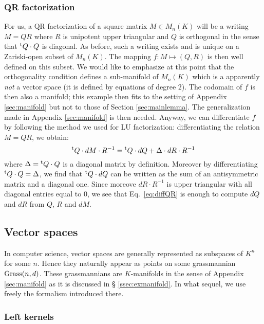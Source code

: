 \documentclass{lms}
\begin{document}
\subsubsection*{QR factorization}

For us, a QR factorization of a square matrix $M \in M_n(K)$ will be
a writing $M = QR$ where $R$ is unipotent upper triangular and $Q$ is
orthogonal in the sense that ${}^{\text t} Q \cdot Q$ is diagonal. As before, such 
a writing exists and is unique on a Zariski-open subset of $M_n(K)$. The
mapping $f : M \mapsto (Q,R)$ is then well defined on this subset. We 
would like to emphasize at this point that the orthogonality condition
defines a sub-manifold of $M_n(K)$ which is a apparently \emph{not} a
vector space (it is defined by equations of degree $2$). The codomain
of $f$ is then also a manifold; this example then fits to the setting
of Appendix \ref{sec:manifold} but not to those of Section \ref{sec:mainlemma}. 
The generalization made in Appendix \ref{sec:manifold} is then needed.
Anyway, we can differentiate $f$ by following the method we used for LU 
factorization: differentiating the relation $M = QR$, we obtain:
\begin{equation}
\label{eq:diffQR}
{}^{\text t} Q \cdot dM \cdot R^{-1} = {}^{\text t} Q \cdot dQ + \Delta \cdot dR 
\cdot R^{-1}
\end{equation}
where $\Delta = {}^{\text t} Q \cdot Q$ is a diagonal matrix by definition.
Moreover by differentiating ${}^{\text t} Q \cdot Q = \Delta$, we find that
${}^{\text t} Q \cdot dQ$ can be written as the sum of an antisymmetric 
matrix and a diagonal one. Since moreove $dR \cdot R^{-1}$ is upper
triangular with all diagonal entries equal to $0$, we see that 
Eq.~\eqref{eq:diffQR} is enough to compute $dQ$ and $dR$ from $Q$, $R$ 
and $dM$.

\subsection{Vector spaces}

In computer science, vector spaces are generally represented as subspaces 
of $K^n$ for some $n$. Hence they naturally appear as points on some 
grassmannian $\text{\rm Grass}(n,d)$. These grassmannians are $K$-manifolds in the 
sense of Appendix \ref{sec:manifold} as it is discussed in \S 
\ref{ssec:exmanifold}. In what sequel, we use freely the formalism 
introduced there.

\subsubsection*{Left kernels}
\end{document}
